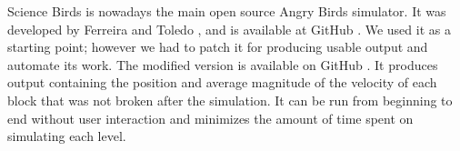 \documentclass[runningheads,a4paper]{llncs}
\begin{document}








Science Birds is nowadays the main open source Angry Birds simulator. It was developed by  Ferreira and Toledo \cite{ferreira2014search}, and is available at
GitHub \cite{sciencebirds}. We used it  as a starting point; however we
had to patch it for producing usable output 
and automate its work. The modified 
version is available on GitHub \cite{sciencebirds-adapt}. It produces output 
containing the position and average magnitude of the velocity of each block 
that was not broken after the simulation. It can be run from beginning to end 
without user interaction and minimizes the amount of time spent on simulating 
each level. 
\end{document}
